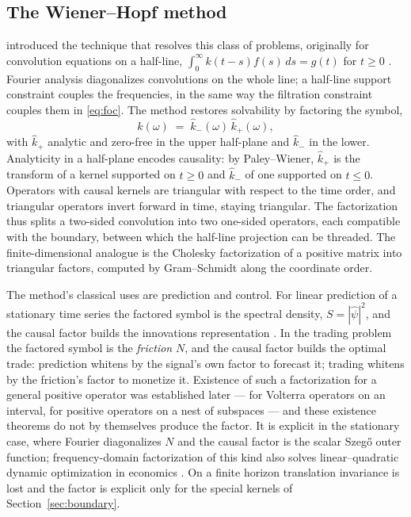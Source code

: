 \documentclass[11pt]{article}
\theoremstyle{plain}
\theoremstyle{definition}
\theoremstyle{remark}
\begin{document}
\subsection{The Wiener--Hopf method}\label{sec:thesis}

\citet{WienerHopf1931} introduced the technique that resolves this class of problems, originally for convolution equations on a half-line, $\int_0^\infty k(t-s)f(s)\,ds=g(t)$ for $t\ge0$ \citep{Krein1962,Noble1958}. Fourier analysis diagonalizes convolutions on the whole line; a half-line support constraint couples the frequencies, in the same way the filtration constraint couples them in \eqref{eq:foc}. The method restores solvability by factoring the symbol,
\[
\hat k(\omega) \;=\; \hat k_-(\omega)\,\hat k_+(\omega),
\]
with $\hat k_+$ analytic and zero-free in the upper half-plane and $\hat k_-$ in the lower. Analyticity in a half-plane encodes causality: by Paley--Wiener, $\hat k_+$ is the transform of a kernel supported on $t\ge0$ and $\hat k_-$ of one supported on $t\le0$. Operators with causal kernels are triangular with respect to the time order, and triangular operators invert forward in time, staying triangular. The factorization thus splits a two-sided convolution into two one-sided operators, each compatible with the boundary, between which the half-line projection can be threaded. The finite-dimensional analogue is the Cholesky factorization of a positive matrix into triangular factors, computed by Gram--Schmidt along the coordinate order.

The method's classical uses are prediction and control. For linear prediction of a stationary time series the factored symbol is the spectral density, $S=|\hat\psi|^2$, and the causal factor builds the innovations representation \citep{Wiener1949,Whittle1963}. In the trading problem the factored symbol is the \emph{friction} $N$, and the causal factor builds the optimal trade: prediction whitens by the signal's own factor to forecast it; trading whitens by the friction's factor to monetize it. Existence of such a factorization for a general positive operator was established later --- \citet{GohbergKrein1970} for Volterra operators on an interval, \citet{Arveson1975} for positive operators on a nest of subspaces --- and these existence theorems do not by themselves produce the factor. It is explicit in the stationary case, where Fourier diagonalizes $N$ and the causal factor is the scalar Szeg\H{o} outer function; frequency-domain factorization of this kind also solves linear--quadratic dynamic optimization in economics \citep{Whiteman1985}. On a finite horizon translation invariance is lost and the factor is explicit only for the special kernels of Section~\ref{sec:boundary}.
\end{document}
